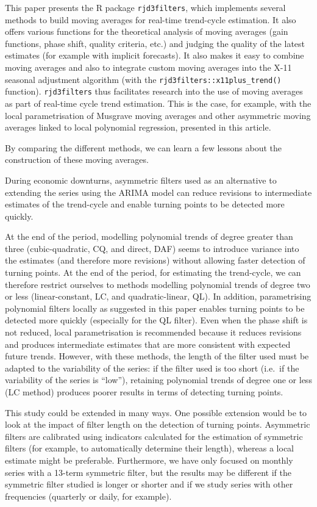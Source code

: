 \documentclass[
]{article}
\newcommand\1{\mathds{1}}
\begin{document}
This paper presents the R package \texttt{rjd3filters}, which implements
several methods to build moving averages for real-time trend-cycle
estimation. It also offers various functions for the theoretical
analysis of moving averages (gain functions, phase shift, quality
criteria, etc.) and judging the quality of the latest estimates (for
example with implicit forecasts). It also makes it easy to combine
moving averages and also to integrate custom moving averages into the
X-11 seasonal adjustment algorithm (with the
\texttt{rjd3filters::x11plus\_trend()} function). \texttt{rjd3filters}
thus facilitates research into the use of moving averages as part of
real-time cycle trend estimation. This is the case, for example, with
the local parametrisation of Musgrave moving averages and other
asymmetric moving averages linked to local polynomial regression,
presented in this article.

By comparing the different methods, we can learn a few lessons about the
construction of these moving averages.

During economic downturns, asymmetric filters used as an alternative to
extending the series using the ARIMA model can reduce revisions to
intermediate estimates of the trend-cycle and enable turning points to
be detected more quickly.

At the end of the period, modelling polynomial trends of degree greater
than three (cubic-quadratic, CQ, and direct, DAF) seems to introduce
variance into the estimates (and therefore more revisions) without
allowing faster detection of turning points. At the end of the period,
for estimating the trend-cycle, we can therefore restrict ourselves to
methods modelling polynomial trends of degree two or less
(linear-constant, LC, and quadratic-linear, QL). In addition,
parametrising polynomial filters locally as suggested in this paper
enables turning points to be detected more quickly (especially for the
QL filter). Even when the phase shift is not reduced, local
parametrisation is recommended because it reduces revisions and produces
intermediate estimates that are more consistent with expected future
trends. However, with these methods, the length of the filter used must
be adapted to the variability of the series: if the filter used is too
short (i.e.~if the variability of the series is ``low''), retaining
polynomial trends of degree one or less (LC method) produces poorer
results in terms of detecting turning points.

This study could be extended in many ways. One possible extension would
be to look at the impact of filter length on the detection of turning
points. Asymmetric filters are calibrated using indicators calculated
for the estimation of symmetric filters (for example, to automatically
determine their length), whereas a local estimate might be preferable.
Furthermore, we have only focused on monthly series with a 13-term
symmetric filter, but the results may be different if the symmetric
filter studied is longer or shorter and if we study series with other
frequencies (quarterly or daily, for example).
\end{document}
